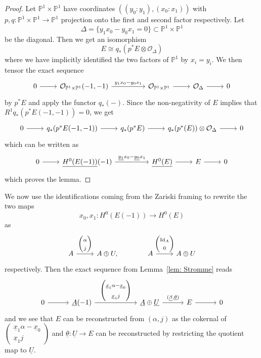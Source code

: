 \documentclass{amsart}
\theoremstyle{definition}
\newcommand{\PP}{\mathbb{P}}
\newcommand{\OO}{\mathcal{O}}
\newcommand{\UL}[1]{\underline{#1}}
\newcommand{\Id}{\operatorname{Id}}
\begin{document}
\begin{proof}
Let $\PP^{1}\times \PP^{1}$ have coordinates
$((y_{0}:y_{1}),(x_{0}:x_{1}))$ with $p,q:\PP^{1}\times \PP^{1}\to
\PP^{1}$ projection onto the first and second factor respectively. Let 
\[
\Delta =\{y_{1}x_{0}-y_{0}x_{1} =0 \}\subset \PP^{1}\times \PP^{1}
\]
be the diagonal. Then we get an isomorphism
\[
E\cong q_{*}\left(p^{*}E\otimes \OO_{\Delta} \right)
\]
where we have implicitly identified the two factors of $\PP^{1}$ by
$x_{i}=y_{i}$.  We then tensor the exact sequence
\[
\begin{tikzcd}
0\arrow[r] & \OO_{\PP^{1}\times \PP^{1}}(-1,-1)
\arrow{rr}{y_{1}x_{0}-y_{0}x_{1}}& & \OO_{\PP^{1}\times \PP^{1}}
\arrow[r]& \OO_{\Delta} \arrow[r]& 0
\end{tikzcd}
\]
by $p^{*}E$ and apply the functor $q_{*}(-)$. Since the non-negativity
of $E$ implies that $R^{1}q_{*}(p^{*}E(-1,-1))=0$, we get
\[
\begin{tikzcd}
0\arrow[r] &q_{*}(p^{*}E(-1,-1)) \arrow[r] & q_{*}(p^{*}E) \arrow[r] &
q_{*}(p^{*}(E))\otimes \OO_{\Delta} \arrow[r] & 0 
\end{tikzcd}
\]
which can be written as 
\[
\begin{tikzcd}
0\arrow[r] &\UL{H^{0}(E(-1))}(-1)
\arrow{rr}{\UL{y_{1}}x_{0}-\UL{y_{0}}x_{1}} && \UL{H^{0}(E)} \arrow[r]
&E \arrow[r] &0
\end{tikzcd}
\]
which proves the lemma.
\end{proof}

We now use the identifications coming from the Zariski framing to
rewrite the two maps
\[
x_{0},x_{1}: H^{0}(E(-1)) \to H^{0}(E)
\]
as
\[
\begin{tikzcd}
A \arrow{r}{\begin{pmatrix} \alpha \\ j  \end{pmatrix}} &A\oplus U,
\quad & A \arrow{r}{\begin{pmatrix} \Id_{A} \\ 0  \end{pmatrix}} &A\oplus U
\end{tikzcd}
\]
respectively. Then the exact sequence from Lemma~\ref{lem: Stromme}
reads
\begin{equation}\label{eqn: A(-1)->A+U->E}
\begin{tikzcd}[column sep=3em]
  0
    \arrow[r]
  & \UL{A}(-1)
    \arrow[rr,"{%
      \begin{pmatrix}
        \UL{x}_{1}\alpha - \UL{x}_{0} \\[3pt]
        \UL{x}_{1}j
      \end{pmatrix}
    }"]
  && \UL{A}\oplus \UL{U}
    \arrow[r,"{(\UL{\beta},\UL{\theta})}"]
  & E
    \arrow[r]
  & 0
\end{tikzcd}
\end{equation}
and we see that $E$ can be reconstructed from $(\alpha ,j)$ as
the cokernal of $ \left(\begin{smallmatrix} \UL{x}_{1} \alpha -\UL{x}_{0}\\ 
\UL{x}_{1}j \end{smallmatrix} \right)$ and $\UL{\theta}:\UL{U}\to E$
can be reconstructed by restricting the quotient map to $\UL{U}$.
\end{document}
